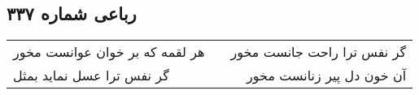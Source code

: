 \begin{center}
\section*{رباعی شماره ۳۳۷}
\label{sec:sh337}
\begin{longtable}{l p{0.5cm} r}
هر لقمه که بر خوان عوانست مخور
&&
گر نفس ترا راحت جانست مخور
\\
گر نفس ترا عسل نماید بمثل
&&
آن خون دل پیر زنانست مخور
\\
\end{longtable}
\end{center}
